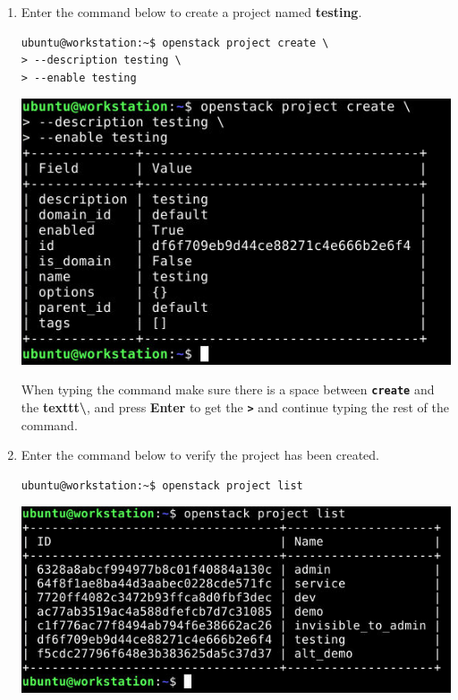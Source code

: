 \documentclass[letterpaper, 12pt]{article}
\begin{document}
\begin{enumerate}
    \item Enter the command below to create a project named \textbf{testing}.
\begin{lstlisting}
ubuntu@workstation:~$ openstack project create \
> --description testing \
> --enable testing
\end{lstlisting}

    \begin{center}
        \includegraphics[width=\linewidth]{images/part2/step3.png}
    \end{center}

    \begin{tipbox}{}
        When typing the command make sure there is a space between \textbf{\texttt{create}} and the
        \textbf{texttt{\textbackslash}}, and press \textbf{Enter} to get the \textbf{\texttt{>}} and continue typing the
        rest of the command.
    \end{tipbox}

    \item Enter the command below to verify the project has been created.
\begin{lstlisting}
ubuntu@workstation:~$ openstack project list
\end{lstlisting}

    \begin{center}
        \includegraphics[width=\linewidth]{images/part2/step4.png}
    \end{center}


\end{enumerate}
\end{document}
